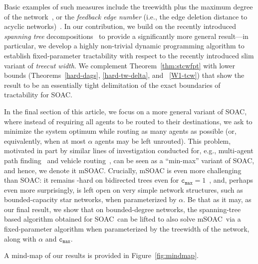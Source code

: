\documentclass[letterpaper]{article} %
\newcommand{\problem}{{\sc SOAC}\xspace} %
\newcommand{\mproblem}{{\sc mSOAC}\xspace} %
\newcommand{\cmax}{\mathtt{c_{max}}}
\begin{document}
Basic examples of such measures include the treewidth plus the maximum degree of the network~\cite{OrdyniakS13,GozupekOPSS17}, or the
 \emph{feedback edge number} (i.e., the edge deletion distance to acyclic networks)~\cite{KoanaKNNZ21,FuchsleMNR22}. In our contribution, we build on the recently introduced \emph{spanning tree} decompositions~\cite{GanianK21,GanianK22} to provide a significantly more general result---in particular, we develop
a highly non-trivial dynamic programming algorithm to establish fixed-parameter tractability with respect to the recently introduced slim variant of \emph{treecut width}. We complement Theorem~\ref{thm:stcwfpt} with lower bounds (Theorems~\ref{hard-dags}, \ref{hard-tw-delta}, and ~\ref{W1-tcw}) that show the result to be an essentially tight delimitation of the exact boundaries of tractability for \problem.

In the final section of this article, we focus on a more general variant of \problem, where instead of requiring all agents to be routed to their destinations, we ask to minimize the system optimum while routing as many agents as possible (or, equivalently, when at most $\alpha$ agents may be left unrouted).
This problem, motivated in part by similar lines of investigation conducted for, e.g., multi-agent path finding~\cite{Huang0KD22} and vehicle routing~\cite{PhamHVN22,AbuMonsharA22}, can be seen as a ``min-max'' variant of \problem, and hence, we denote it \mproblem. Crucially, \mproblem
is even more challenging than \problem: it remains \NP-hard on bidirected trees even for $\cmax=1$~\cite{ErlebachJansen01}, and, perhaps even more surprisingly, is left open on very simple network structures, such as bounded-capacity star networks, when parameterized by $\alpha$. Be that as it may, as our final result, we show that on bounded-degree networks, the spanning-tree based algorithm obtained for \problem\ can be lifted to also solve \mproblem\ via a fixed-parameter algorithm when parameterized by the treewidth of the network, along with $\alpha$ and $\cmax$.

A mind-map of our results is provided in Figure~\ref{fig:mindmap}.
\end{document}
